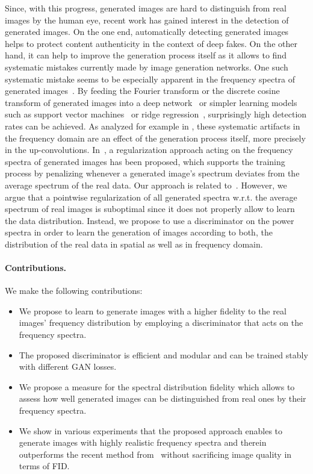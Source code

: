\documentclass[letterpaper]{article} %
\begin{document}
Since, with this progress, generated images are hard to distinguish from real images by the human eye, recent work has gained interest in the detection of generated images. On the one end, automatically detecting generated images helps to protect content authenticity in the context of deep fakes. On the other hand, it can help to improve the generation process itself as it allows to find systematic mistakes currently made by image generation networks. One such systematic mistake seems to be especially apparent in the frequency spectra of generated images~\cite{durall2019unmasking,Wang_2020_CVPR,frank2020leveraging,bai2020fake}. By feeding the Fourier transform or the discrete cosine transform of generated images into a deep network~\cite{Wang_2020_CVPR} or simpler learning models such as support vector machines~\cite{durall2019unmasking} or ridge regression~\cite{frank2020leveraging}, surprisingly high detection rates can be achieved. As analyzed for example in \cite{durall2019unmasking,frank2020leveraging}, these systematic artifacts in the frequency domain are an effect of the generation process itself, more precisely in the up-convolutions.
In~\cite{margret2020upconvolution}, a regularization approach acting on the frequency spectra of generated images has been proposed, which supports the training process by penalizing whenever a generated image's spectrum deviates from the average spectrum of the real data.
Our approach is related to~\cite{margret2020upconvolution}. However, we argue that a pointwise regularization of all generated spectra w.r.t. the average spectrum of real images is suboptimal since it does not properly allow to learn the data distribution. Instead, we propose to use a discriminator on the power spectra in order to learn the generation of images according to both, the distribution of the real data in spatial as well as in frequency domain.

\paragraph{Contributions.} We make the following contributions:
\begin{itemize}
    \item We propose to learn to generate images with a higher fidelity to the real images' frequency distribution by employing a discriminator that acts on the frequency spectra.
    \item The proposed discriminator is efficient and modular and can be trained stably with different GAN losses.
    \item We propose a measure for the spectral distribution fidelity which allows to assess how well generated images can be distinguished from real ones by their frequency spectra.
    \item We show in various experiments that the proposed approach enables to generate images with highly realistic frequency spectra and therein outperforms the recent method from~\cite{margret2020upconvolution} without sacrificing image quality in terms of FID.
\end{itemize}
\end{document}
